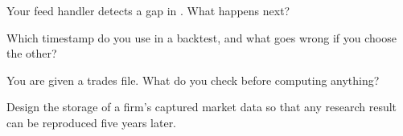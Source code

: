 \begin{interviewq}\label{iq:m1:reading-market-data:3}
Your feed handler detects a gap in . What happens next?
\end{interviewq}

\begin{interviewq}\label{iq:m1:reading-market-data:4}
Which timestamp do you use in a backtest, and what goes wrong if you choose
the other?
\end{interviewq}

\begin{interviewq}\label{iq:m1:reading-market-data:5}
You are given a trades file. What do you check before computing anything?
\end{interviewq}

\begin{interviewq}\label{iq:m1:reading-market-data:6}
Design the storage of a firm's captured market data so that any research
result can be reproduced five years later.
\end{interviewq}
